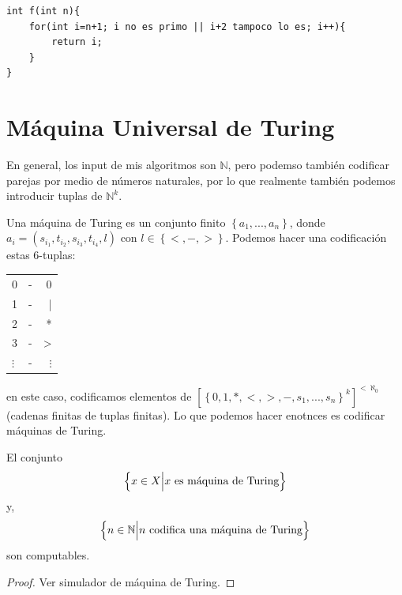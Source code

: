 \documentclass[12pt]{report}
\newcounter{it}
\theoremstyle{largebreak}
\begin{document}
    \begin{lstlisting}
int f(int n){
    for(int i=n+1; i no es primo || i+2 tampoco lo es; i++){
        return i;
    }
}
    \end{lstlisting}

    \section{Máquina Universal de Turing}

    En general, los input de mis algoritmos son $\mathbb{N}$, pero podemso también codificar parejas por medio de números naturales, por lo que realmente también podemos introducir tuplas de $\mathbb{N}^k$.

    \begin{obs}
        Una máquina de Turing es un conjunto finito $\left\{a_1,...,a_n \right\}$, donde $a_i=(s_{i_1},t_{i_2},s_{i_3},t_{i_4},l)$ con $l\in\left\{<,-,> \right\}$. Podemos hacer una codificación estas 6-tuplas:
        \begin{center}
            \begin{tabular}{l | c | r}
                0 & - & 0 \\
                1 & - & | \\
                2 & - & * \\
                3 & - & > \\
                $\vdots$ & - & $\vdots$ \\
            \end{tabular}
        \end{center}
        en este caso, codificamos elementos de $\left[\left\{0,1,*,<,>,-,s_1,...,s_n \right\}^k\right]^{<\aleph_0}$ (cadenas finitas de tuplas finitas). Lo que podemos hacer enotnces es codificar máquinas de Turing.
    \end{obs}

    \begin{theor}
        El conjunto
        \begin{equation*}
            \left\{x\in X\Big|x\textup{ es máquina de Turing} \right\}
        \end{equation*}
        y,
        \begin{equation*}
            \left\{n\in\mathbb{N}\Big|n\textup{ codifica una máquina de Turing} \right\}
        \end{equation*}
        son computables.
    \end{theor}

    \begin{proof}
        Ver simulador de máquina de Turing.
    \end{proof}
    
\end{document}
